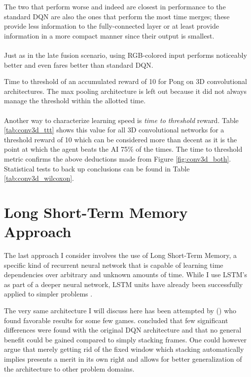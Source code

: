 The two that perform worse and indeed
are closest in performance to the standard DQN
are also the ones that perform the most time merges;
these provide less information to the fully-connected layer
or at least provide information in a more compact manner
since their output is smallest.

\paragraph{}
Just as in the late fusion scenario,
using RGB-colored input performs noticeably better
and even fares better than standard DQN.

\begin{table}
  \center
  \renewcommand{\arraystretch}{1.3}
  
  \caption[3D Conv time to threshold]{
    Time to threshold
    of an accumulated reward of 10
    for Pong
    on 3D convolutional architectures.
    The max pooling architecture is left out
    because it did not always manage the threshold
    within the allotted time.
  }
  \label{tab:conv3d_ttt}
\end{table}

\paragraph{}
Another way to characterize learning speed is
\textit{time to threshold} reward.
Table \ref{tab:conv3d_ttt}
shows this value for all 3D convolutional networks
for a threshold reward of 10
which can be considered more than decent
as it is the point at which
the agent beats the AI
75\% of the times.
The time to threshold metric
confirms the above deductions made
from Figure \ref{fig:conv3d_both}.
Statistical tests to back up conclusions
can be found in Table \ref{tab:conv3d_wilcoxon}.

\section{Long Short-Term Memory Approach}
\label{sec:long_short_term_memory_approach}
The last approach I consider involves
the use of Long Short-Term Memory,
a specific kind of recurrent neural network
that is capable of learning time dependencies
over arbitrary and unknown amounts of time.
While I use LSTM's
as part of a deeper neural network,
LSTM units have already been successfully applied
to simpler problems
\parencite{Bakker2001}.

The very same architecture I will discuss here
has been attempted by
\citeauthor{Hausknecht2015} (\citeyear{Hausknecht2015})
who found favorable results for some few games.
\citeauthor{Hausknecht2015}
concluded that few significant differences
were found with the original DQN architecture
and that no general benefit could be gained compared
to simply stacking frames.
One could however argue
that merely getting rid of the fixed window
which stacking automatically implies
presents a merit in its own right
and allows for better generalization of the architecture
to other problem domains.


